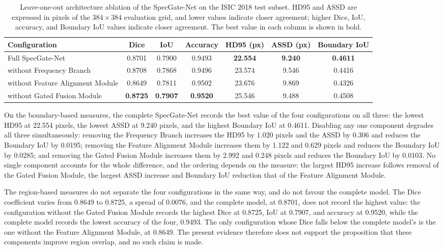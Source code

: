 \begin{table}[!t]
\centering
\caption{Leave-one-out architecture ablation of the SpecGate-Net on the ISIC 2018 test subset. HD95
and ASSD are expressed in pixels of the $384\times384$ evaluation grid, and lower
values indicate closer agreement; higher Dice, IoU, accuracy, and Boundary IoU
values indicate closer agreement. The best value in each column is shown in
bold.}
\label{tab:ablation}
\setlength{\tabcolsep}{6pt}
\small
\begin{tabular}{lcccccc}
\toprule
Configuration & Dice & IoU & Accuracy & HD95 (px) & ASSD (px) & Boundary IoU \\
\midrule
Full SpecGate-Net & 0.8701 & 0.7900 & 0.9493 & \textbf{22.554} & \textbf{9.240} & \textbf{0.4611} \\
without Frequency Branch & 0.8708 & 0.7868 & 0.9496 & 23.574 & 9.546 & 0.4416 \\
without Feature Alignment Module & 0.8649 & 0.7811 & 0.9502 & 23.676 & 9.869 & 0.4326 \\
without Gated Fusion Module & \textbf{0.8725} & \textbf{0.7907} & \textbf{0.9520} & 25.546 & 9.488 & 0.4508 \\
\bottomrule
\end{tabular}
\end{table}

On the boundary-based measures, the complete SpecGate-Net records the best value of the four configurations on all three: the lowest HD95 at 22.554 pixels, the lowest ASSD at 9.240 pixels, and the highest Boundary IoU at 0.4611. Disabling any one component degrades all three simultaneously: removing the Frequency Branch increases the HD95 by 1.020 pixels and the ASSD by 0.306 and reduces the Boundary IoU by 0.0195; removing the Feature Alignment Module increases them by 1.122 and 0.629 pixels and reduces the Boundary IoU by 0.0285; and removing the Gated Fusion Module increases them by 2.992 and 0.248 pixels and reduces the Boundary IoU by 0.0103. No single component accounts for the whole difference, and the ordering depends on the measure: the largest HD95 increase follows removal of the Gated Fusion Module, the largest ASSD increase and Boundary IoU reduction that of the Feature Alignment Module.

The region-based measures do not separate the four configurations in the same way, and do not favour the complete model. The Dice coefficient varies from 0.8649 to 0.8725, a spread of 0.0076, and the complete model, at 0.8701, does not record the highest value: the configuration without the Gated Fusion Module records the highest Dice at 0.8725, IoU at 0.7907, and accuracy at 0.9520, while the complete model records the lowest accuracy of the four, 0.9493. The only configuration whose Dice falls below the complete model's is the one without the Feature Alignment Module, at 0.8649. The present evidence therefore does not support the proposition that these components improve region overlap, and no such claim is made.

